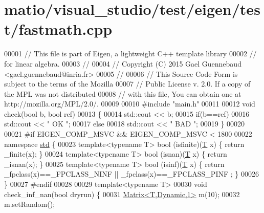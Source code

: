 \hypertarget{matio_2visual__studio_2test_2eigen_2test_2fastmath_8cpp_source}{}\section{matio/visual\+\_\+studio/test/eigen/test/fastmath.cpp}
\label{matio_2visual__studio_2test_2eigen_2test_2fastmath_8cpp_source}

\begin{DoxyCode}
00001 \textcolor{comment}{// This file is part of Eigen, a lightweight C++ template library}
00002 \textcolor{comment}{// for linear algebra.}
00003 \textcolor{comment}{//}
00004 \textcolor{comment}{// Copyright (C) 2015 Gael Guennebaud <gael.guennebaud@inria.fr>}
00005 \textcolor{comment}{//}
00006 \textcolor{comment}{// This Source Code Form is subject to the terms of the Mozilla}
00007 \textcolor{comment}{// Public License v. 2.0. If a copy of the MPL was not distributed}
00008 \textcolor{comment}{// with this file, You can obtain one at http://mozilla.org/MPL/2.0/.}
00009 
00010 \textcolor{preprocessor}{#include "main.h"}
00011 
00012 \textcolor{keywordtype}{void} check(\textcolor{keywordtype}{bool} b, \textcolor{keywordtype}{bool} ref)
00013 \{
00014   std::cout << b;
00015   \textcolor{keywordflow}{if}(b==ref)
00016     std::cout << \textcolor{stringliteral}{" OK  "};
00017   \textcolor{keywordflow}{else}
00018     std::cout << \textcolor{stringliteral}{" BAD "};
00019 \}
00020 
00021 \textcolor{preprocessor}{#if EIGEN\_COMP\_MSVC && EIGEN\_COMP\_MSVC < 1800}
00022 \textcolor{keyword}{namespace }\hyperlink{namespacestd}{std} \{
00023   \textcolor{keyword}{template}<\textcolor{keyword}{typename} T> bool (isfinite)(\hyperlink{group___sparse_core___module}{T} x) \{ \textcolor{keywordflow}{return} \_finite(x); \}
00024   \textcolor{keyword}{template}<\textcolor{keyword}{typename} T> bool (isnan)(\hyperlink{group___sparse_core___module}{T} x) \{ \textcolor{keywordflow}{return} \_isnan(x); \}
00025   \textcolor{keyword}{template}<\textcolor{keyword}{typename} T> bool (isinf)(\hyperlink{group___sparse_core___module}{T} x) \{ \textcolor{keywordflow}{return} \_fpclass(x)==\_FPCLASS\_NINF || \_fpclass(x)==\_FPCLASS\_PINF
      ; \}
00026 \}
00027 \textcolor{preprocessor}{#endif}
00028 
00029 \textcolor{keyword}{template}<\textcolor{keyword}{typename} T>
00030 \textcolor{keywordtype}{void} check\_inf\_nan(\textcolor{keywordtype}{bool} dryrun) \{
00031   \hyperlink{group___core___module_class_eigen_1_1_matrix}{Matrix<T,Dynamic,1>} m(10);
00032   m.setRandom();

\end{DoxyCode}
